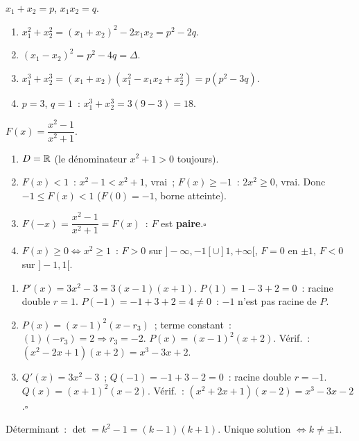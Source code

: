 $x_1+x_2=p$, $x_1x_2=q$.
\begin{enumerate}
  \item $x_1^2+x_2^2=(x_1+x_2)^2-2x_1x_2=p^2-2q$.
  \item $(x_1-x_2)^2=p^2-4q=\Delta$.
  \item $x_1^3+x_2^3=(x_1+x_2)(x_1^2-x_1x_2+x_2^2)=p(p^2-3q)$.
  \item $p=3$, $q=1$~: $x_1^3+x_2^3=3(9-3)=18$.\checkmark
\end{enumerate}


$F(x)=\dfrac{x^2-1}{x^2+1}$.
\begin{enumerate}
  \item $D=\mathbb{R}$ (le d\'enominateur $x^2+1>0$ toujours).
  \item $F(x)<1$~: $x^2-1<x^2+1$, vrai~; $F(x)\geq-1$~: $2x^2\geq0$, vrai.
        Donc $-1\leq F(x)<1$ ($F(0)=-1$, borne atteinte).
  \item $F(-x)=\dfrac{x^2-1}{x^2+1}=F(x)$~: $F$ est \textbf{paire}.\hfill$\square$
  \item $F(x)\geq0\Leftrightarrow x^2\geq1$~: $F>0$ sur $]-\infty,-1[\cup]1,+\infty[$,
        $F=0$ en $\pm1$, $F<0$ sur $]-1,1[$.
\end{enumerate}


\begin{enumerate}
  \item $P'(x)=3x^2-3=3(x-1)(x+1)$. $P(1)=1-3+2=0$~: racine double $r=1$.
        $P(-1)=-1+3+2=4\ne0$~: $-1$ n'est pas racine de $P$.
  \item $P(x)=(x-1)^2(x-r_3)$~; terme constant~: $(1)(-r_3)=2\Rightarrow r_3=-2$.
        $P(x)=(x-1)^2(x+2)$. V\'erif.~: $(x^2-2x+1)(x+2)=x^3-3x+2$.\checkmark
  \item $Q'(x)=3x^2-3$~; $Q(-1)=-1+3-2=0$~: racine double $r=-1$.
        $Q(x)=(x+1)^2(x-2)$. V\'erif.~: $(x^2+2x+1)(x-2)=x^3-3x-2$.\checkmark\hfill$\square$
\end{enumerate}


D\'eterminant~: $\det=k^2-1=(k-1)(k+1)$.
Unique solution $\Leftrightarrow k\ne\pm1$.

